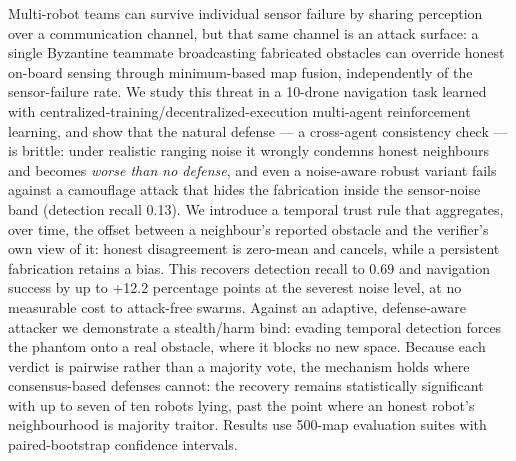 Multi-robot teams can survive individual sensor failure by sharing perception
over a communication channel, but that same channel is an attack surface: a
single Byzantine teammate broadcasting fabricated obstacles can override
honest on-board sensing through minimum-based map fusion, independently of
the sensor-failure rate. We study this threat in a 10-drone navigation task
learned with centralized-training/decentralized-execution multi-agent
reinforcement learning, and show that the natural defense --- a cross-agent
consistency check --- is brittle: under realistic ranging noise it wrongly
condemns honest neighbours and becomes \emph{worse than no defense}, and even
a noise-aware robust variant fails against a camouflage attack that hides the
fabrication inside the sensor-noise band (detection recall 0.13). We
introduce a temporal trust rule that aggregates, over time, the offset
between a neighbour's reported obstacle and the verifier's own view of it:
honest disagreement is zero-mean and cancels, while a persistent fabrication
retains a bias. This recovers detection recall to 0.69 and navigation success
by up to +12.2 percentage points at the severest noise level, at no
measurable cost to attack-free swarms. Against an adaptive, defense-aware
attacker we demonstrate a stealth/harm bind: evading temporal detection
forces the phantom onto a real obstacle, where it blocks no new space.
Because each verdict is pairwise rather than a majority vote, the mechanism
holds where consensus-based defenses cannot: the recovery remains
statistically significant with up to seven of ten robots lying, past the
point where an honest robot's neighbourhood is majority traitor.
Results use 500-map evaluation suites with paired-bootstrap confidence
intervals. %

